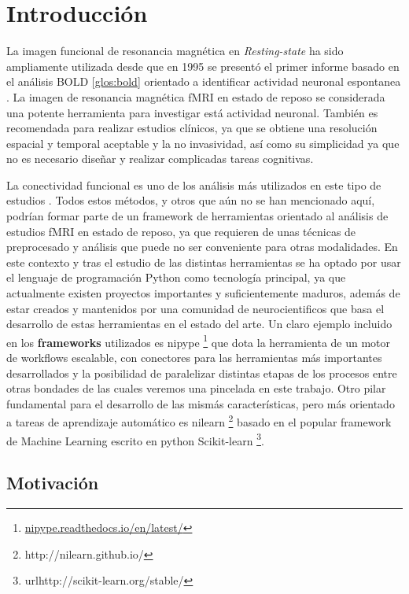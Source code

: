 \chapter{Introducción}

La imagen funcional de resonancia magnética en \textit{Resting-state} ha sido ampliamente utilizada desde que en 1995 se presentó el primer informe basado en el análisis BOLD \ref{glos:bold} orientado a identificar actividad neuronal espontanea \cite{mattoolbox}. La imagen de resonancia magnética fMRI en estado de reposo se considerada una potente herramienta para investigar está actividad neuronal. También es recomendada para realizar estudios clínicos, ya que se obtiene una resolución espacial y temporal aceptable y la no invasividad, así como su simplicidad ya que no es necesario diseñar y realizar complicadas tareas cognitivas.

La conectividad funcional es uno de los análisis más utilizados en este tipo de estudios \cite{biswal,heuvel}. Todos estos métodos, y otros que aún no se han mencionado aquí, podrían formar parte de un framework de herramientas orientado al análisis de estudios fMRI en estado de reposo, ya que requieren de unas técnicas de preprocesado y análisis que puede no ser conveniente para otras modalidades. En este contexto y tras el estudio de las distintas herramientas se ha optado por usar el lenguaje de programación Python como tecnología principal, ya que actualmente existen proyectos importantes y suficientemente maduros, además de estar creados y mantenidos por una comunidad de neurocientificos que basa el desarrollo de estas herramientas en el estado del arte. Un claro ejemplo incluido en los \textbf{frameworks} utilizados es nipype \footnote{\url{nipype.readthedocs.io/en/latest/}} que dota la herramienta de un motor de workflows escalable, con conectores para las herramientas más importantes desarrollados y la posibilidad de paralelizar distintas etapas de los procesos entre otras bondades de las cuales veremos una pincelada en este trabajo. Otro pilar fundamental para el desarrollo de las mismás características, pero más orientado a tareas de aprendizaje automático es nilearn \footnote{http://nilearn.github.io/} basado en el popular framework de Machine Learning escrito en python Scikit-learn \footnote{url{http://scikit-learn.org/stable/}}.

\section{Motivación}

